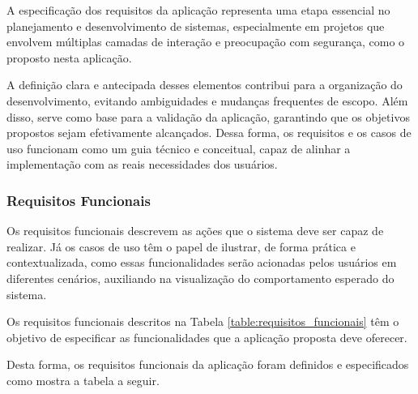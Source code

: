 A especificação dos requisitos da aplicação representa uma etapa
essencial no planejamento e desenvolvimento de sistemas,
especialmente em projetos que envolvem múltiplas camadas de interação
e preocupação com segurança, como o proposto nesta aplicação.

A definição clara e antecipada
desses elementos contribui para a organização do desenvolvimento,
evitando ambiguidades e mudanças frequentes de escopo. Além disso,
serve como base para a validação da aplicação, garantindo que os
objetivos propostos sejam efetivamente alcançados. Dessa forma, os
requisitos e os casos de uso funcionam como um guia técnico e
conceitual, capaz de alinhar a implementação com as reais
necessidades dos usuários.

\subsubsection{Requisitos Funcionais}

Os requisitos funcionais descrevem as ações que o sistema deve ser capaz
de realizar. Já os casos de uso têm o papel de ilustrar, de forma
prática e contextualizada, como essas funcionalidades serão acionadas
pelos usuários em diferentes cenários, auxiliando na visualização do
comportamento esperado do sistema.

Os requisitos funcionais descritos na Tabela
\ref{table:requisitos_funcionais} têm o objetivo de especificar as
funcionalidades que a aplicação proposta deve oferecer.

Desta forma, os requisitos funcionais da aplicação foram definidos e
especificados como mostra a tabela a seguir.


